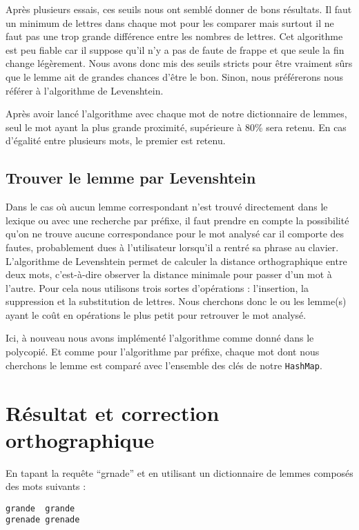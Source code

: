 Après plusieurs essais, ces seuils nous ont semblé donner de bons résultats. Il faut un minimum de lettres dans chaque mot pour les comparer mais surtout il ne faut pas une trop grande différence entre les nombres de lettres. Cet algorithme est peu fiable car il suppose qu'il n'y a pas de faute de frappe et que seule la fin change légèrement. Nous avons donc mis des seuils stricts pour être vraiment sûrs que le lemme ait de grandes chances d'être le bon. Sinon, nous préférerons nous référer à l'algorithme de Levenshtein.

\medskip

Après avoir lancé l'algorithme avec chaque mot de notre dictionnaire de lemmes, seul le mot ayant la plus grande proximité, supérieure à 80\% sera retenu. En cas d'égalité entre plusieurs mots, le premier est retenu.

\subsection{Trouver le lemme par Levenshtein}

Dans le cas où aucun lemme correspondant n'est trouvé directement dans le lexique ou avec une recherche par préfixe, il faut prendre en compte la possibilité qu'on ne trouve aucune correspondance pour le mot analysé car il comporte des fautes, probablement dues à l'utilisateur lorsqu'il a rentré sa phrase au clavier. L'algorithme de Levenshtein permet de calculer la distance orthographique entre deux mots, c'est-à-dire observer la distance minimale pour passer d'un mot à l'autre. Pour cela nous utilisons trois sortes d'opérations : l'insertion, la suppression et la substitution de lettres. Nous cherchons donc le ou les lemme(s) ayant le coût en opérations le plus petit pour retrouver le mot analysé.

\medskip

Ici, à nouveau nous avons implémenté l'algorithme comme donné dans le polycopié. Et comme pour l'algorithme par préfixe, chaque mot dont nous cherchons le lemme est comparé avec l'ensemble des clés de notre \lstinline{HashMap}.

\section{Résultat et correction orthographique}

En tapant la requête ``grnade'' et en utilisant un dictionnaire de lemmes composés des mots suivants :

\begin{lstlisting}
grande  grande
grenade grenade
\end{lstlisting}

